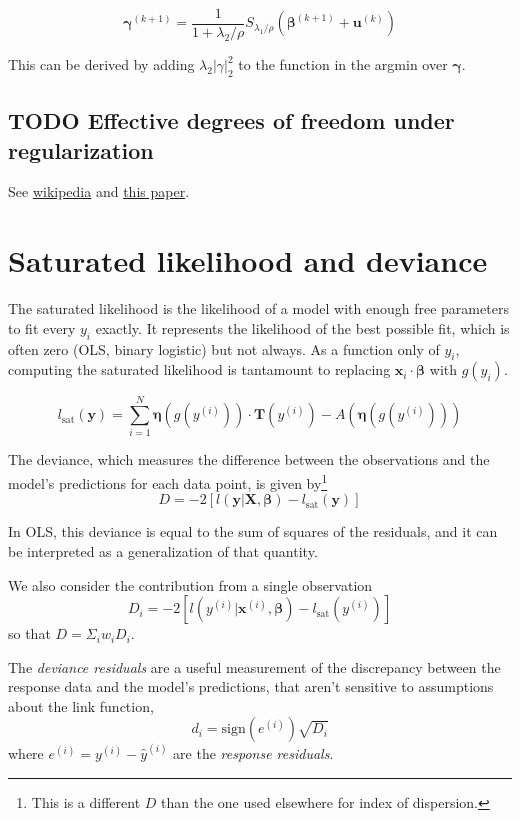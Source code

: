 \documentclass{article}
\newcommand{\bbeta}{\boldsymbol{\beta}}
\begin{document}
\[ \boldsymbol{\gamma}^{(k+1)} = \frac{1}{1 + \lambda_2/\rho} S_{\lambda_1/\rho}(\bbeta^{(k+1)} + \mathbf{u}^{(k)}) \]

This can be derived by adding \(\lambda_2|\gamma|_2^2\) to the function in
the argmin over \(\boldsymbol{\gamma}\).

\subsection{TODO Effective degrees of freedom under regularization}

See
\href{https://en.wikipedia.org/wiki/Degrees_of_freedom_(statistics)#In_non-standard_regression}{wikipedia}
and \href{https://arxiv.org/abs/1311.2791}{this paper}.


\section{Saturated likelihood and deviance}

The saturated likelihood is the likelihood of a model with enough free
parameters to fit every \(y_i\) exactly. It represents the likelihood of the
best possible fit, which is often zero (OLS, binary logistic) but not always.
As a function only of \(y_i\), computing the saturated likelihood is
tantamount to replacing \(\mathbf{x}_i\cdot\bbeta\) with
\(g(y_i)\).

\[l_{\textrm{sat}}(\mathbf{y}) = \sum_{i=1}^N
\boldsymbol{\eta}(g(y^{(i)})) \cdot
\mathbf{T}(y^{(i)}) - A\left(\boldsymbol{\eta}(g(y^{(i)})) \right)\]

The deviance, which measures the difference between the observations and the
model's predictions for each data point, is given by\footnote{
    This is a different \(D\) than the one used elsewhere for index of dispersion.
}
\[D = -2\left[ l(\mathbf{y}|\mathbf{X}, \bbeta) - l_{\textrm{sat}}(\mathbf{y}) \right]\]

In OLS, this deviance is equal to the sum of squares of the residuals, and it
can be interpreted as a generalization of that quantity.

We also consider the contribution from a single observation
\[D_i = -2\left[ l(y^{(i)}|\mathbf{x}^{(i)}, \bbeta) - l_{\textrm{sat}}(y^{(i)}) \right]\]
so that \(D = \Sigma_i w_i D_i\).

The \emph{deviance residuals} are a useful measurement of the discrepancy
between the response data and the model's predictions, that aren't sensitive to
assumptions about the link function,
\[ d_i = \mathrm{sign}(e^{(i)}) \sqrt{D_i} \]
where \(e^{(i)} = y^{(i)} - \hat{y}^{(i)}\) are the \emph{response residuals}.
\end{document}

